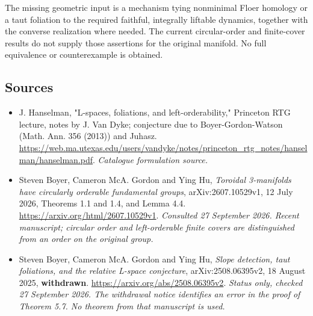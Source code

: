 \documentclass[11pt,a4paper]{article}
\numberwithin{equation}{section}
\begin{document}
The missing geometric input is a mechanism tying nonminimal Floer homology
or a taut foliation to the required faithful, integrally liftable dynamics,
together with the converse realization where needed. The current
circular-order and finite-cover results do not supply those assertions for
the original manifold. No full equivalence or counterexample is obtained.
\subsection{Sources}
\begin{itemize}\raggedright
\item[\textnormal{[S1]}]\hypertarget{source:30006775:1}{} J. Hanselman, "L-spaces, foliations, and left-orderability," Princeton RTG lecture, notes by J. Van Dyke; conjecture due to Boyer-Gordon-Watson (Math. Ann. 356 (2013)) and Juhasz.
\url{https://web.ma.utexas.edu/users/vandyke/notes/princeton_rtg_notes/hanselman/hanselman.pdf}.
{\small\textit{Catalogue formulation source.}}
\item[\textnormal{[E1]}]\hypertarget{extra:30006775:1}{} Steven Boyer, Cameron
McA. Gordon and Ying Hu, \emph{Toroidal 3-manifolds have circularly orderable
fundamental groups}, arXiv:2607.10529v1, 12 July 2026, Theorems 1.1 and 1.4,
and Lemma 4.4. \url{https://arxiv.org/html/2607.10529v1}.
{\small\textit{Consulted 27 September 2026. Recent manuscript; circular
order and left-orderable finite covers are distinguished from an order
on the original group.}}
\item[\textnormal{[E2]}]\hypertarget{extra:30006775:2}{} Steven Boyer, Cameron
McA. Gordon and Ying Hu, \emph{Slope detection, taut foliations, and the
relative L-space conjecture}, arXiv:2508.06395v2, 18 August 2025,
\textbf{withdrawn}. \url{https://arxiv.org/abs/2508.06395v2}.
{\small\textit{Status only, checked 27 September 2026. The withdrawal
notice identifies an error in the proof of Theorem 5.7. No theorem from
that manuscript is used.}}
\end{itemize}
\end{document}
